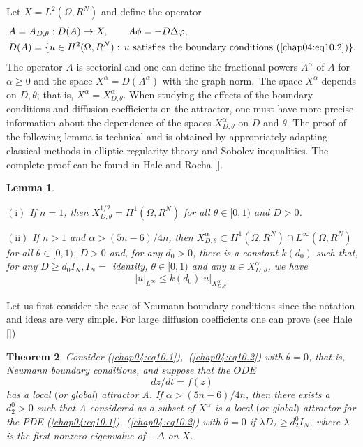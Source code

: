 \documentclass{surv-l}
\theoremstyle{plain}
\newtheorem{theorem}{Theorem}[section]
\newtheorem{lemma}[theorem]{Lemma}
\theoremstyle{definition}
\numberwithin{equation}{section}
\numberwithin{figure}{chapter}
\begin{document}
Let $X=L^{2}(\Omega, R^{N})$ and define the operator
\begin{equation}\label{chap04:eq10.3}
\begin{split}
&A=A_{D,\theta}:D(A)\rightarrow X,\quad\quad A\phi = -D\Delta\varphi,\\
&D(A)=\{u\in H^{2}(\Omega, R^{N}):\,u \text{ satisfies the boundary conditions } (\ref{chap04:eq10.2})\}.
\end{split}
\end{equation}
The operator $A$ is sectorial and one can define the fractional powers $A^{\alpha}$ of $A$ for $\alpha \geq 0$ and the space $X^{\alpha}=D(A^{\alpha})$ with the graph norm.\, The space $X^{\alpha}$ depends on $D, \theta$; that is, $X^{\alpha}=X_{D,\theta}^{\alpha}$. When studying the effects of the boundary conditions and diffusion coefficients on the attractor, one must have more precise information about the dependence of the spaces $X_{D,\theta}^{\alpha}$ on $D$ and $\theta$. The proof of the following lemma is technical and is obtained by appropriately adapting classical methods in elliptic regularity theory and Sobolev inequalities. The complete proof can be found in Hale and Rocha [\citeyear{1987hrb}].

\begin{lemma}\label{lem4.10.1}\

$\mathrm{(i)}$ If $n=1$, then $X_{D,\theta}^{1/2}=H^{1}(\Omega, R^{N})$ for all $\theta\in[0,1)$ and $D>0$.

$\mathrm{(ii)}$ If $n>1$ and $\alpha >(5n-6)/4n$, then $X_{D,\theta}^{\alpha}\subset H^{1}(\Omega, R^{N})\cap L^{\infty}(\Omega, R^{N})$ for all $\theta\in[0,1)$, $D>0$ and, for any $d_{0}>0$, there is a constant $k(d_{0})$ such that, for any $D\geq d_{0}I_{N}, I_{N}=$ identity, $\theta\in[0,1)$ and any $u\in X_{D,\theta}^{\alpha}$, we have
\begin{equation*}
|u|_{L^\infty}\leq k(d_{0})|u|_{X_{D,\theta}^{\alpha}}.
\end{equation*}
\end{lemma}
Let us first consider the case of Neumann boundary conditions since the notation and ideas are very simple. For large diffusion coefficients one can prove (see Hale [\citeyear{1986h}])

\begin{theorem}\label{thm4.10.2} Consider \emph{(\ref{chap04:eq10.1})},\, \emph{(\ref{chap04:eq10.2})} with $\theta=0$, that is, Neumann boundary conditions, and suppose that the $ODE$
\begin{equation}\label{chap04:eq10.4}
dz/dt=f(z)
\end{equation}
has a local $($or global$)$ attractor A. If $\alpha>(5n-6)/4n$, then there exists a $d_{2}^{0}>0$ such that A considered as a subset of $X^{\alpha}$ is a local $($or global$)$ attractor for the PDE \emph{(\ref{chap04:eq10.1})}, \emph{(\ref{chap04:eq10.2})} with $\theta=0$ if $\lambda D_{2}\geq d_{2}^{0}I_{N}$, where $\lambda$ is the first nonzero eigenvalue of $-\Delta$ on $X$.
\end{theorem}
\end{document}
